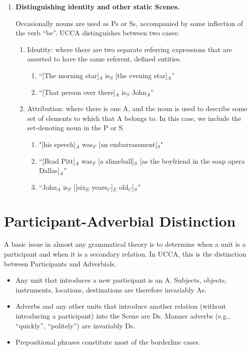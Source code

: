 \documentclass[11pt]{article}
\newcommand{\be}{\begin{enumerate}}
\newcommand{\ee}{\end{enumerate}}
\begin{document}
{\begin {enumerate}
\begin{enumerate}
\begin{itemize}
\end{itemize}
\end{enumerate}

\item
{\bf Distinguishing identity and other static Scenes.}\label{identity}

Occasionally nouns are used as Ps or Ss, accompanied by some inflection of the verb ``be''. UCCA distinguishes between two cases:
\be \item
Identity: where there are two separate referring expressions that are asserted to have the same referent, defined entities.
\be 
\item
``[The morning star]$_A$ is$_S$ [the evening star]$_A$''
\item
``[That person over there]$_A$ is$_S$ John$_A$''
\ee

\item
Attribution: where there is one A, and the noun is used to describe some set of elements to which that A belongs to. In this case, we include the set-denoting noun in the P or S.
\be \item
"[his speech]$_A$ was$_F$ [an embarrassment]$_S$"
\item
``[Brad Pitt]$_A$ was$_F$ [a slimeball]$_S$ [as the boyfriend in the soap opera Dallas]$_A$''
\item
``John$_A$ is$_F$ [[six$_E$ years$_C$]$_E$ old$_C$]$_S$''
\ee
\ee

\end{enumerate}}


\section{Participant-Adverbial Distinction}\label{app:AD-distinction}

A basic issue in almost any grammatical theory is to determine when a unit is a participant and when it is a secondary relation. In UCCA, this is the distinction between Participants and Adverbials.

\begin{itemize}
\item
Any unit that introduces a new participant is an A. Subjects, objects, instruments, locations, destinations are therefore invariably As.
\item
Adverbs and any other units that introduce another relation (without introducing a participant) into the Scene are Ds. Manner adverbs (e.g., ``quickly'', ``politely'') are invariably Ds.
\item
Prepositional phrases constitute most of the borderline cases.
\end{itemize}
\end{document}
